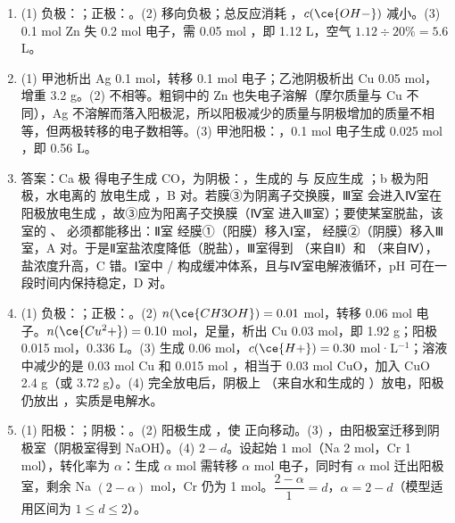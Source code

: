 \documentclass[UTF8,a4paper,zihao=5,oneside,openany,fontset=none]{ctexbook}
\def\heiti{\CJKfamily{zhhei}}
\newenvironment{jiexilist}{\small\begin{enumerate}[label={\textbf{\arabic*}.},leftmargin=1.6em,itemsep=0.3em,topsep=0.2em]}{\end{enumerate}}
\newcommand{\ans}[1]{{\heiti 答案：}#1\quad}
\begin{document}
\begin{jiexilist}
\item (1) 负极：；正极：。(2) 移向负极；总反应消耗 ，$c(\ce{OH-})$ 减小。(3) 0.1 mol Zn 失 0.2 mol 电子，需 0.05 mol ，即 1.12 L，空气 $1.12\div20\%=5.6$ L。
\item (1) 甲池析出 Ag 0.1 mol，转移 0.1 mol 电子；乙池阴极析出 Cu 0.05 mol，增重 3.2 g。(2) 不相等。粗铜中的 Zn 也失电子溶解（摩尔质量与 Cu 不同），Ag 不溶解而落入阳极泥，所以阳极减少的质量与阴极增加的质量不相等，但两极转移的电子数相等。(3) 甲池阳极：，0.1 mol 电子生成 0.025 mol ，即 0.56 L。
\item \ans{C}a 极  得电子生成 CO，为阴极：，生成的  与  反应生成 ；b 极为阳极，水电离的  放电生成 ，B 对。若膜③为阴离子交换膜，Ⅲ室  会进入Ⅳ室在阳极放电生成 ，故③应为阳离子交换膜（Ⅳ室  进入Ⅲ室）；要使某室脱盐，该室的 、 必须都能移出：Ⅱ室  经膜①（阳膜）移入Ⅰ室， 经膜②（阴膜）移入Ⅲ室，A 对。于是Ⅱ室盐浓度降低（脱盐），Ⅲ室得到 （来自Ⅱ）和 （来自Ⅳ），盐浓度升高，C 错。Ⅰ室中 / 构成缓冲体系，且与Ⅳ室电解液循环，pH 可在一段时间内保持稳定，D 对。
\item (1) 负极：；正极：。(2) $n(\ce{CH3OH})=0.01$ mol，转移 0.06 mol 电子。$n(\ce{Cu^2+})=0.10$ mol，足量，析出 Cu 0.03 mol，即 1.92 g；阳极  0.015 mol，0.336 L。(3) 生成  0.06 mol，$c(\ce{H+})=0.30$ mol·L$^{-1}$；溶液中减少的是 0.03 mol Cu 和 0.015 mol ，相当于 0.03 mol CuO，加入 CuO 2.4 g（或  3.72 g）。(4)  完全放电后，阴极上 （来自水和生成的 ）放电，阳极仍放出 ，实质是电解水。
\item (1) 阳极：；阴极：。(2) 阳极生成 ，使  正向移动。(3) ，由阳极室迁移到阴极室（阴极室得到 NaOH）。(4) $2-d$。设起始  1 mol（Na 2 mol，Cr 1 mol），转化率为 $\alpha$：生成 $\alpha$ mol  需转移 $\alpha$ mol 电子，同时有 $\alpha$ mol  迁出阳极室，剩余 Na $(2-\alpha)$ mol，Cr 仍为 1 mol。$\dfrac{2-\alpha}{1}=d$，$\alpha=2-d$（模型适用区间为 $1\le d\le2$）。
\end{jiexilist}
\end{document}
